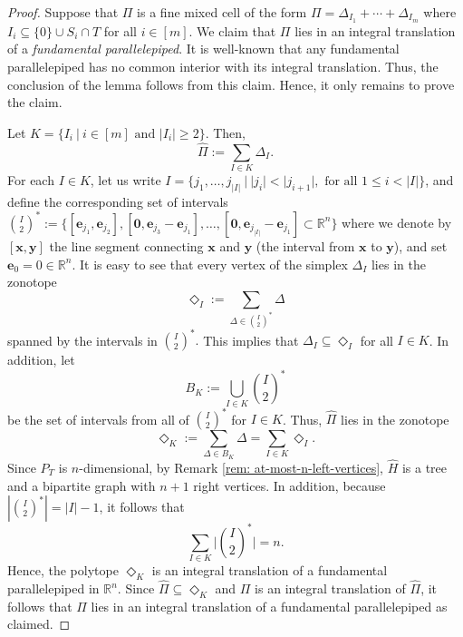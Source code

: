 \documentclass[10pt,a4paper]{amsart}
\newcommand{\R}{\mathbb R}
\newcommand{\bbe}{\mathbf{e}}
\newcommand{\bbx}{\mathbf{x}}
\newcommand{\bby}{\mathbf{y}}
\begin{document}
\begin{proof}
    Suppose that $\Pi$ is a fine mixed cell of the form $\Pi = \Delta_{I_1} + \cdots + \Delta_{I_m}$ where  $I_i \subseteq \{0\}\cup S_i\cap T$ for all $i \in [m]$. We claim that $\Pi$ lies in an integral translation of a \emph{fundamental parallelepiped}. It is well-known that any fundamental parallelepiped has no common interior with its integral translation. Thus, the conclusion of the lemma follows from this claim. Hence, it only remains to prove the claim.
    
    Let $K = \{I_i\ | \ i \in [m] \text{ and } |I_i| \geq 2\}$. Then, 
    \[\hat{\Pi} := \sum_{I \in K}\Delta_I.\]
    For each $I \in K$, let us write $I= \{j_1, \dots, j_{|I|}\ | \ |j_i| < |j_{i+1}|, \text{ for all } 1 \leq i < |I| \}$, and define the corresponding set of intervals 
    $\binom{I}{2}^* := \{[\bbe_{j_1}, \bbe_{j_2}], [\mathbf{0}, \bbe_{j_3} - \bbe_{j_1}], \dots, [\mathbf{0},\bbe_{j_{|I|}} - \bbe_{j_1}] \subset \R^n\}$
    where we denote by $[\bbx, \bby]$ the line segment connecting $\bbx$ and $\bby$ (the interval from $\bbx$ to $\bby$), and set $\bbe_0 = \mathrm{0} \in \R^n$. It is easy to see that every vertex of the simplex $\Delta_I$ lies in the zonotope
    \[\Diamond_I := \sum_{\Delta \in \binom{I}{2}^*}\Delta\]
    spanned by the intervals in $\binom{I}{2}^*.$ This implies that $\Delta_I \subseteq \Diamond_I$ for all $I \in K$. In addition, let
    \[B_K := \bigcup_{I \in K} \binom{I}{2}^*\]
    be the set of intervals from all of $\binom{I}{2}^*$ for $I \in K$. Thus, $\hat{\Pi}$ lies in the zonotope
    \[\Diamond_K := \sum_{\Delta \in B_K}\Delta = \sum_{I \in K}\Diamond_I.\]
    Since $P_T$ is $n$-dimensional, by Remark \ref{rem: at-most-n-left-vertices}, $\hat{H}$ is a tree and a bipartite graph with $n+1$ right vertices. In addition, because $|\binom{I}{2}^*| = |I|-1$, it follows that $$\sum_{I \in K}\Big|\binom{I}{2}^*\Big| = n.$$ Hence, the polytope $\Diamond_K$ is an integral translation of a fundamental parallelepiped in $\R^n$. Since $\hat{\Pi} \subseteq \Diamond_K$ and $\Pi$ is an integral translation of $\hat{\Pi}$, it follows that $\Pi$ lies in an integral translation of a fundamental parallelepiped as claimed.
\end{proof}
\end{document}
